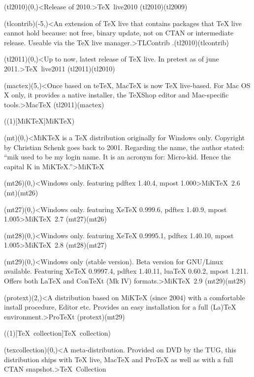 {	\tonode(tl2010)(0,\layer)<Release of 2010.>{\TeX\ live2010}
	\todraw(tl2010)(tl2009)

	\tonode(tlcontrib)(-5,\layer)<An extension of TeX live that contains packages that TeX live cannot hold because: not free, binary update, not on CTAN or intermediate release. Useable via the TeX live manager.>{TLContrib}
	\todraw.(tl2010)(tlcontrib)
	\steplayer

	\tonode(tl2011)(0,\layer)<Up to now, latest release of TeX live. In pretest as of june 2011.>{\TeX\ live2011}
	\todraw(tl2011)(tl2010)

	\tonode(mactex)(5,\layer)<Once based on teTeX, MacTeX is now TeX live-based. For Mac OS X only, it provides a native installer, the TeXShop editor and Mac-specific tools.>{Mac\TeX}
	\todraw(tl2011)(mactex)
}

\tograph(\tostruct(1)[MiK\TeX]{MiK\TeX}){
	\tonode(mt)(0,\layer)<MiKTeX is a TeX distribution originally for Windows only. Copyright by Christian Schenk goes back to 2001. Regarding the name, the author stated: “mik used to be my login name. It is an acronym for: Micro-kid. Hence the capital K in MiKTeX.”>{MiK\TeX}
	\steplayer

	\tonode(mt26)(0,\layer)<Windows only. featuring  pdftex 1.40.4, mpost 1.000>{MiK\TeX\ 2.6}
	\todraw(mt)(mt26)
	\steplayer

	\tonode(mt27)(0,\layer)<Windows only. featuring  XeTeX 0.999.6, pdftex 1.40.9, mpost 1.005>{MiK\TeX\ 2.7}
	\todraw(mt27)(mt26)
	\steplayer

	\tonode(mt28)(0,\layer)<Windows only. featuring  XeTeX 0.9995.1, pdftex 1.40.10, mpost 1.005>{MiK\TeX\ 2.8}
	\todraw(mt28)(mt27)
	\steplayer

	\tonode(mt29)(0,\layer)<Windows only (stable version). Beta version for GNU/Linux available. Featuring XeTeX 0.9997.4, pdftex 1.40.11, luaTeX 0.60.2, mpost 1.211. Offers both LaTeX and ConTeXt (Mk IV) formats.>{MiK\TeX\ 2.9}
	\todraw(mt29)(mt28)
	\steplayer	
	
	\tonode(protext)(2,\layer)<A distribution based on MiKTeX (since 2004) with a comfortable install procedure, Editor etc. Provides an easy installation for a full (La)TeX environment.>{ProTeXt}
	\todraw(protext)(mt29)
}

\tograph(\tostruct(1)[\TeX\ collection]{\TeX\ collection}){
	\tonode(texcollection)(0,\layer)<A meta-distribution. Provided on DVD by the TUG, this distribution ships with TeX live, MacTeX and ProTeX as well as with a full CTAN snapshot.>{\TeX\ Collection}

}

